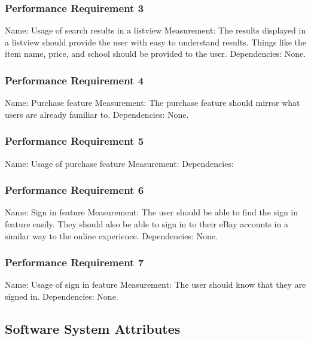 \documentclass[journal,compsoc, 10pt, draftclsnofoot, onecolumn]{IEEEtran}
\begin{document}
\subsubsection{Performance Requirement 3}
Name: Usage of search results in a listview\newline
Measurement: The results displayed in a listview should provide the user with 
easy to understand results. Things like the item name, price, and school should 
be provided to the user.\newline
Dependencies: None.

\subsubsection{Performance Requirement 4}
Name: Purchase feature\newline
Measurement: The purchase feature should mirror what users are already familiar 
to.\newline
Dependencies: None.

\subsubsection{Performance Requirement 5}
Name: Usage of purchase feature\newline
Measurement:\newline 
Dependencies: 

\subsubsection{Performance Requirement 6}
Name: Sign in feature\newline
Measurement: The user should be able to find the sign in feature easily. They 
should also be able to sign in to their eBay accounts in a similar way to the 
online experience. \newline
Dependencies: None.

\subsubsection{Performance Requirement 7}
Name: Usage of sign in feature\newline
Measurement: The user should know that they are signed in. \newline
Dependencies: None.

\subsection{Software System Attributes}
\end{document}
